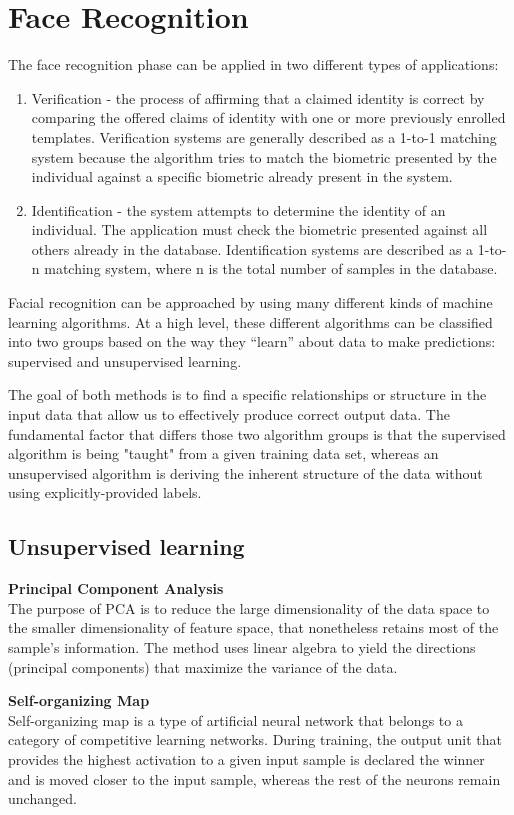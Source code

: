 \section{Face Recognition}
The face recognition phase can be applied in two different types of applications: 

\begin{enumerate}
\itemsep0em
\item Verification - the process of affirming that a claimed identity is correct by comparing the offered claims of identity with one or more previously enrolled templates. Verification systems are generally described as a 1-to-1 matching system because the algorithm tries to match the biometric presented by the individual against a specific biometric already present in the system.
\item Identification - the system attempts to determine the identity of an individual. The application  must check the biometric presented against all others already in the database. Identification systems are described as a 1-to-n matching system, where n is the total number of samples in the database. 
\end{enumerate}

Facial recognition can be approached by using many different kinds of machine learning algorithms. At a high level, these different algorithms can be classified into two groups based on the way they “learn” about data to make predictions: supervised and unsupervised learning.

The goal of both methods is to find a specific relationships or structure in the input data that allow us to effectively produce correct output data. The fundamental factor that differs those two algorithm groups is that the supervised algorithm is being "taught" from a given training data set, whereas an unsupervised algorithm is deriving the inherent structure of the data without using explicitly-provided labels. 

\subsection{Unsupervised learning}
\par
\textbf{Principal Component Analysis}
\\
The purpose of PCA is to reduce the large dimensionality of the data space to the smaller dimensionality of feature space, that nonetheless retains most of the sample's information. The method uses linear algebra to yield the directions (principal components) that maximize the variance of the data. 
\\
\par
\textbf{Self-organizing Map}
\\
Self-organizing map is a type of artificial neural network that belongs to a category of competitive learning networks. During training, the output unit that provides the highest activation to a given input sample is declared the winner and is moved closer to the input sample, whereas the rest of the neurons remain unchanged.

